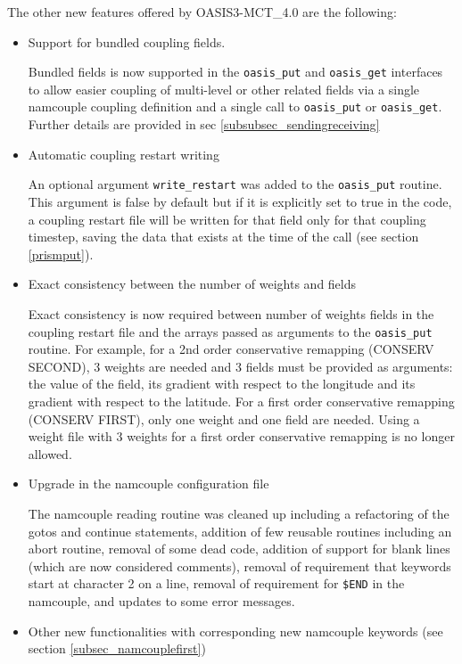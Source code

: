 The other new features offered by OASIS3-MCT\_4.0 are the following:

\begin{itemize}

\item Support for bundled coupling fields.

Bundled fields is now supported in the {\tt oasis\_put} and {\tt oasis\_get} interfaces to allow
easier coupling of multi-level or other related fields via a single
namcouple coupling definition and a single call to {\tt oasis\_put} or {\tt oasis\_get}.
Further details are provided in sec \ref{subsubsec_sendingreceiving}

\item Automatic coupling restart writing

An optional argument {\tt write\_restart} was added to the {\tt oasis\_put} routine. This argument is false by default but if it is explicitly set to true in the code, a coupling restart file will be written for that field only for that coupling timestep, saving the data that exists at the time of the call (see section \ref{prismput}).

\item Exact consistency between the number of weights and fields

Exact consistency is now required between number of weights fields in the coupling restart file and the arrays passed as arguments to the {\tt oasis\_put} routine. For example, for a 2nd order conservative remapping (CONSERV SECOND), 3 weights are needed and 3 fields must be provided as arguments: the value of the field, its gradient with respect to the longitude and its gradient with respect to the latitude. For a first order conservative remapping (CONSERV FIRST), only one weight and one field are needed. Using a weight file with 3 weights for a first order conservative remapping is no longer allowed.

\item Upgrade in the namcouple configuration file

The namcouple reading routine was cleaned up including a refactoring of the gotos and continue statements, addition of few reusable routines including an abort routine, removal of some dead code, addition of support for blank lines (which are now considered comments), removal of requirement that keywords start at character 2 on a line, removal of requirement for {\tt \$END} in the namcouple, and updates to some error messages.

\item Other new functionalities with corresponding new namcouple keywords (see section \ref{subsec_namcouplefirst})


\end{itemize}
